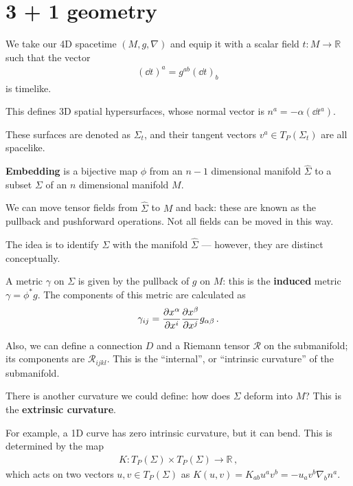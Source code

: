 \documentclass[main.tex]{subfiles}
\begin{document}
\section{3 + 1 geometry}


We take our 4D spacetime \((M, g, \nabla)\) and equip it with a scalar field \(t \colon M \to \mathbb{R}\) such that the vector
%
\begin{align}
(\dd{t})^{a} = g^{ab} (\dd{t})_b
\,
\end{align}
%
is timelike.

This defines 3D spatial hypersurfaces, whose normal vector is \(n^a = - \alpha (\dd{t}^{a})\).

These surfaces are denoted as \(\Sigma _t\), and their tangent vectors \(v^{a} \in T_P(\Sigma _t)\) are all spacelike. 

\textbf{Embedding} is a bijective map \(\phi \) from an \(n-1\) dimensional manifold \(\hat{\Sigma}\) to a subset \(\Sigma \) of an \(n\) dimensional manifold \(M\).

We can move tensor fields from \(\hat{\Sigma}\) to \(M\) and back: these are known as the pullback and pushforward operations.
Not all fields can be moved in this way. 

The idea is to identify \(\Sigma \) with the manifold \(\hat{\Sigma}\) --- however, they are distinct conceptually. 

A metric \(\gamma \) on \(\Sigma \) is given by the pullback of \(g\) on \(M\): this is the \textbf{induced} metric \(\gamma = \phi^{*} g\). 
The components of this metric are calculated as 
%
\begin{align}
\gamma_{ij} = \pdv{x^{\alpha }}{x^{i}} \pdv{x^{\beta }}{x^{j}} g_{\alpha \beta }
\,.
\end{align}

Also, we can define a connection \(D\) and a Riemann tensor \(\mathcal{R}\) on the submanifold; its components are \(\mathcal{R}_{ijkl}\). 
This is the ``internal'', or ``intrinsic curvature'' of the submanifold.

There is another curvature we could define: how does \(\Sigma \) deform into \(M\)? This is the \textbf{extrinsic curvature}. 

For example, a 1D curve has zero intrinsic curvature, but it can bend. 
This is determined by the map 
%
\begin{align}
K \colon T_P (\Sigma ) \times T_P (\Sigma ) \to \mathbb{R}
\,,
\end{align}
%
which acts on two vectors \(u, v \in T_P(\Sigma )\) as \(K (u, v) = K_{ab} u^a v^b = - u_a v^b \nabla_b n^a\).
\end{document}
